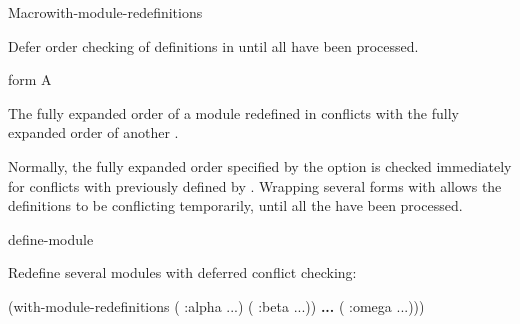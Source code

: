 \documentclass[10pt,twoside,english,pdftex]{article}
\begin{document}
\begin{functiondoc}{Macro}{with-module-redefinitions}%
  {\superstar} 
%
%
%

\fnsyntax 

\fnpurpose Defer  order checking of 
definitions in  until all  have been processed.

\fnpackage {}

\fnmodule {}

\fnargs
\begin{args}{form}
\arg[form] A 
\end{args}

\fnerrors The fully expanded  order of a module
redefined in  conflicts with the fully expanded
 order of another .

\fndescription Normally, the fully expanded  order
specified by the  option is checked immediately for
conflicts with previously defined  by
.  Wrapping several
 forms with
 allows the definitions to be
conflicting temporarily, until all the  have been processed.

\begin{alsos}{define-module}
\end{alsos}

\fnexample
{}%
Redefine several modules with deferred conflict checking:
%
\W\supp
\begin{example}
  (with-module-redefinitions
    ( :alpha \textrm{...})
    ( :beta \textrm{...}))
            \textbf{...}
    ( :omega \textrm{...})))
\end{example}

\end{functiondoc}


\T\markright{}%
\T\pagestyle{plain}
\T\cleardoublepage
\W{}
\T\pagestyle{fancy}
\T\thispagestyle{fancybottom}
\T\global\def\fnlastname{ }%
\T\renewcommand{\headrulewidth}{0pt}
\end{document}
